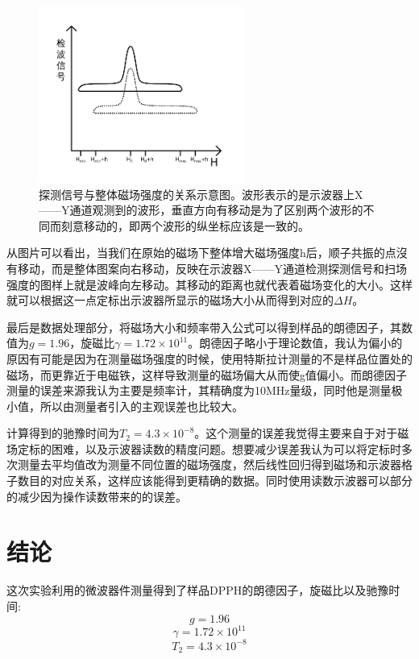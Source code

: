 \documentclass[aps,pre,12pt,preprint,onecolumn,showpacs,showkeys,UTF8]{revtex4-1}
\begin{document}
\begin{figure}[h]
	\begin{center}
		\includegraphics[width=0.6\textwidth]{pic7.png}
	\end{center}
\caption{\label{fig:exp4}探测信号与整体磁场强度的关系示意图。波形表示的是示波器上X——Y通道观测到的波形，垂直方向有移动是为了区别两个波形的不同而刻意移动的，即两个波形的纵坐标应该是一致的。}
\end{figure}

从图片可以看出，当我们在原始的磁场下整体增大磁场强度h后，顺子共振的点沒有移动，而是整体图案向右移动，反映在示波器X——Y通道检测探测信号和扫场强度的图样上就是波峰向左移动。其移动的距离也就代表着磁场变化的大小。这样就可以根据这一点定标出示波器所显示的磁场大小从而得到对应的$\Delta H$。

最后是数据处理部分，将磁场大小和频率带入公式可以得到样品的朗德因子，其数值为$g=1.96$，旋磁比$\gamma=1.72\times 10^{11}$。朗德因子略小于理论数值，我认为偏小的原因有可能是因为在测量磁场强度的时候，使用特斯拉计测量的不是样品位置处的磁场，而更靠近于电磁铁，这样导致测量的磁场偏大从而使g值偏小。而朗德因子测量的误差来源我认为主要是频率计，其精确度为10MHz量级，同时他是测量极小值，所以由测量者引入的主观误差也比较大。

计算得到的驰豫时间为$T_2=4.3\times 10^{-8}$。这个测量的误差我觉得主要来自于对于磁场定标的困难，以及示波器读数的精度问题。想要减少误差我认为可以将定标时多次测量去平均值改为测量不同位置的磁场强度，然后线性回归得到磁场和示波器格子数目的对应关系，这样应该能得到更精确的数据。同时使用读数示波器可以部分的减少因为操作读数带来的的误差。

\section{结论}

这次实验利用的微波器件测量得到了样品DPPH的朗德因子，旋磁比以及驰豫时间:
$$g=1.96$$
$$\gamma=1.72\times 10^{11}$$
$$T_2=4.3\times 10^{-8}$$
\end{document}
